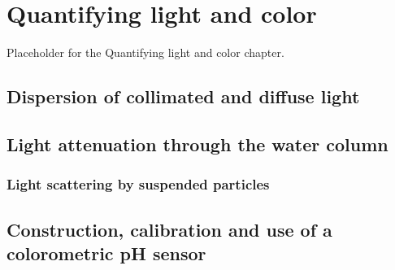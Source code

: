 \setchapterpreamble[u]{\margintoc}
\chapter{\color{gray} Quantifying light and color \color{black}}

Placeholder for the Quantifying light and color chapter.

\section{\color{gray} Dispersion of collimated and diffuse light \color{black}}

\section{\color{gray} Light attenuation through the water column \color{black}}

\subsection{\color{gray} Light scattering by suspended particles \color{black}}

\section{\color{gray} Construction, calibration and use of a colorometric pH sensor \color{black}}
